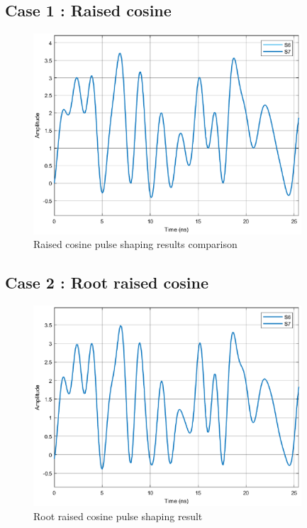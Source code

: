 \begin{refsection}
\subsection*{Case 1 : Raised cosine}
\begin{figure}[h]
	\centering
	\includegraphics[width=10cm]{./algorithms/filter/figures/RC_S6S7.eps}
	\caption{Raised cosine pulse shaping results comparison}
	\label{S6_S7}
\end{figure}

\subsection*{Case 2 : Root raised cosine}
\begin{figure}[h]
	\centering
	\includegraphics[width=10cm]{./algorithms/filter/figures/RRC_S6S7.eps}
	\caption{Root raised cosine pulse shaping result}
	\label{S6_S7_RRCOS}
\end{figure}


\end{refsection}
